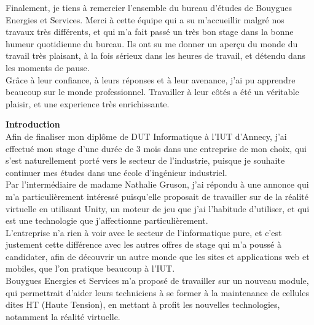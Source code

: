 \documentclass[a4paper]{article}
\begin{document}
    Finalement, je tiens à remercier l'ensemble du bureau d'études de Bouygues Energies et Services. Merci à cette équipe qui a su m'accueillir malgré nos travaux très différents, et qui m'a fait passé un très bon stage dans la bonne humeur quotidienne du bureau. Ils ont su me donner un aperçu du monde du travail très plaisant, à la fois sérieux dans les heures de travail, et détendu dans les moments de pause. \vspace{10pt} \\

    Grâce à leur confiance, à leurs réponses et à leur avenance, j'ai pu apprendre beaucoup sur le monde professionnel. Travailler à leur côtés a été un véritable plaisir, et une experience très enrichissante. \\
    
    \newpage
    \tableofcontents

    \newpage 
    \huge \textbf{Introduction} \vspace{20pt} \\
    \normalsize
    Afin de finaliser mon diplôme de DUT Informatique à l'IUT d'Annecy, j'ai effectué mon stage d'une durée de 3 mois dans une entreprise de mon choix, qui s'est naturellement porté vers le secteur de l'industrie, puisque je souhaite continuer mes études dans une école d'ingénieur industriel. \\

    Par l'intermédiaire de madame Nathalie Gruson, j'ai répondu à une annonce qui m'a particulièrement intéressé puisqu'elle proposait de travailler sur de la réalité virtuelle en utilisant Unity, un moteur de jeu que j'ai l'habitude d'utiliser, et qui est une technologie que j'affectionne particulièrement. \\

    L'entreprise n'a rien à voir avec le secteur de l'informatique pure, et c'est justement cette différence avec les autres offres de stage qui m'a poussé à candidater, afin de découvrir un autre monde que les sites et applications web et mobiles, que l'on pratique beaucoup à l'IUT. \\
    
    Bouygues Energies et Services m'a proposé de travailler sur un nouveau module, qui permettrait d'aider leurs techniciens à se former à la maintenance de cellules dites HT (Haute Tension), en mettant à profit les nouvelles technologies, notamment la réalité virtuelle. \\
\end{document}
